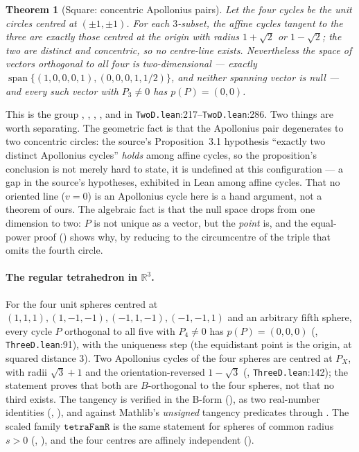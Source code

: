 \documentclass[11pt]{article}
\newtheorem{theorem}{Theorem}
\theoremstyle{definition}
\theoremstyle{remark}
\newcommand{\src}[3]{\texttt{#2}:#3}
\newcommand{\RR}{\mathbb{R}}
\begin{document}
\begin{theorem}[Square: concentric Apollonius pairs]\label{thm:square}
Let the four cycles be the unit circles centred at $(\pm1,\pm1)$. For each $3$-subset, the affine
cycles tangent to the three are exactly those centred at the origin with radius $1+\sqrt2$ or
$1-\sqrt2$; the two are distinct and concentric, so no centre-line exists. Nevertheless the space of
\emph{vectors} orthogonal to all four is two-dimensional --- exactly
$\operatorname{span}\{(1,0,0,0,1),(0,0,0,1,1/2)\}$, and neither spanning vector is null --- and
every such vector with $P_3\neq0$ has $p(P)=(0,0)$.
\end{theorem}

This is the group , ,
, ,
 and  in
\src{PaperK}{TwoD.lean}{217}--\src{PaperK}{TwoD.lean}{286}. Two things are worth separating. The
geometric fact is that the Apollonius pair degenerates to two concentric circles: the source's
Proposition~3.1 hypothesis ``exactly two distinct Apollonius cycles'' \emph{holds} among affine
cycles, so the proposition's conclusion is not merely hard to state, it is undefined at this
configuration --- a gap in the source's hypotheses, exhibited in Lean among affine cycles. That no
oriented line ($v=0$) is an Apollonius cycle here is a hand argument, not a theorem of ours. The algebraic fact is that the
null space drops from one dimension to two: $P$ is not unique as a vector, but the \emph{point} is,
and the equal-power proof () shows why, by reducing to the
circumcentre of the triple that omits the fourth circle.

\paragraph{The regular tetrahedron in $\RR^3$.} For the four unit spheres centred at
$(1,1,1),(1,-1,-1),(-1,1,-1),(-1,-1,1)$ and an arbitrary fifth sphere, every cycle $P$ orthogonal to
all five with $P_4\neq0$ has $p(P)=(0,0,0)$ (,
\src{PaperK}{ThreeD.lean}{91}), with the uniqueness step 
(the equidistant point is the origin, at squared distance $3$). Two Apollonius cycles of the four
spheres are centred at $P_X$, with radii $\sqrt3+1$ and the orientation-reversed $1-\sqrt3$
(, \src{PaperK}{ThreeD.lean}{142}); the statement proves that
both are $B$-orthogonal to the four spheres, not that no third exists. The tangency is verified in the
B-form (), as two real-number identities
(, ), and against Mathlib's
\emph{unsigned} tangency predicates through . The scaled family $\texttt{tetraFamR}$ is the same statement for
spheres of common radius $s>0$ (,
), and the four centres are affinely independent
().
\end{document}
